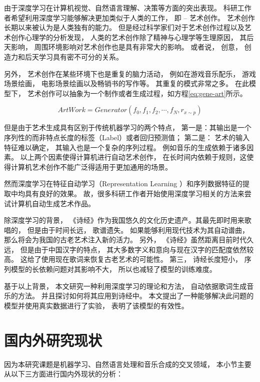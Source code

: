由于深度学习在计算机视觉、自然语言理解、决策等方面的突出表现。 科研工作者希望利用深度学习能够解决更加类似于人类的工作， 即 -- 艺术创作。 艺术创作长期以来被认为是人类独有的能力。 但是经过科学家们对于艺术创作过程以及艺术创作心理学的分析发现， 人类的艺术创作除了精神与心理学等生理原因， 其后天影响， 周围环境影响对艺术创作也是具有非常大的影响。 或者说， 创意， 创造力和后天学习具有密不可分的关系。 \cite{mq-zhanjian} \cite{adomavicius2005toward} \cite{gil2010state}


另外， 艺术创作在某些环境下也是重复的脑力活动， 例如在游戏音乐配乐， 游戏场景绘画， 电影场景绘画以及畅销书的写作等。 其重复的模式非常之多。 在此模型下， 艺术创作可以抽象为一个制作或者生成过程，如方程\eqref{eq:gene-art}所示。 

\begin{equation}\label{eq:gene-art}
ArtWork= Generator(f_0, f_1, f_2, \cdots, f_N, r_{x \sim p})
\end{equation} 

但是由于艺术生成具有区别于传统机器学习的两个特点， 第一是：其输出是一个序列性的而非特点长度的标签（Label）或者回归预测值； 第二是： 艺术的输入特征难以确定， 其输入也是一个复杂的序列过程。 例如音乐的生成依赖于诸多因素。 以上两个因素使得计算机进行自动艺术创作， 在长时间内依赖于规则，这使得计算机艺术创作不能广泛得适用于更加通用的场景。 

然而深度学习在特征自动学习（Representation Learning ）和序列数据特征的提取中均具有良好的效果。 故，很多科研工作者开始使用深度学习相关的方法来尝试计算机自动生成艺术作品。 

除深度学习的背景， 《诗经》作为我国悠久的文化历史遗产。其最先即时用来歌唱的， 但是由于时间长远， 歌谱遗失。 如果能够利用现代技术为其自动谱曲， 那么将会为我国的古老艺术注入新的活力。 另外， 《诗经》虽然距离目前时代久远， 但是由于中国汉字的特点， 其大多数字义和意向与现在汉字的匹配度依然较高。 这给了使用现在歌词来恢复古老艺术的可能性。 第三， 诗经长度短小， 序列模型的长依赖问题对其影响不大， 所以也减轻了模型的训练难度。 

基于以上背景， 本文研究一种利用深度学习的理论和方法， 自动依据歌词生成音乐的方法。 并且探讨如何将其应用到诗经中。 本文提出了一种能够解决此问题的模型并使用真实数据进行了实验， 表明了该模型的有效性。 


\section{国内外研究现状}

因为本研究课题是机器学习、自然语言处理和音乐合成的交叉领域， 本小节主要从以下三方面进行国内外现状的分析： 

